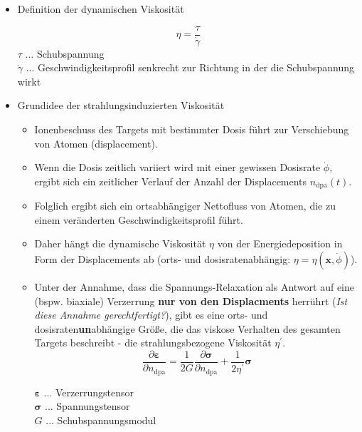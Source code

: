 \documentclass[a4paper, 10pt, 
               numbers=noenddot, toc=graduated,
               headsepline=true, footsepline=true,
               twoside=false, titlepage=true, 
               bibliography=totoc]{scrartcl}
\begin{document}
\begin{itemize}
	\item Definition der dynamischen Viskosität
	
	      \begin{equation}
		  \eta = \frac{\tau }{\dot{\gamma} }
	      \end{equation}
	      $\tau$ ... Schubspannung\\
	      $\dot{\gamma} $ ... Geschwindigkeitsprofil senkrecht zur Richtung in der die Schubspannung wirkt

	\item Grundidee der strahlungsinduzierten Viskosität \cite{hobler2017hpm}
	
		\begin{itemize}
			
			\item Ionenbeschuss des Targets mit bestimmter Dosis führt zur Verschiebung von Atomen (displacement).
			\item Wenn die Dosis zeitlich variiert wird mit einer gewissen Dosisrate $\dot \phi$, ergibt sich ein zeitlicher Verlauf der Anzahl der Displacements $n_\mathrm{dpa}(t)$.
			\item Folglich ergibt sich ein ortsabhängiger Nettofluss von Atomen, die zu einem veränderten Geschwindigkeitsprofil führt.
			
			\item Daher hängt die dynamische Viskosität $\eta$ von der Energiedeposition in Form der Displacements ab (orts- und dosisratenabhängig: $\eta = \eta(\bm{x}, \dot{\phi})$).
			
			\item Unter der Annahme, dass die Spannungs-Relaxation als Antwort auf eine (bspw. biaxiale) Verzerrung \textbf{nur von den Displacments} herrührt (\textit{Ist diese Annahme gerechtfertigt?}), gibt es eine orts- und dosisraten\textbf{un}abhängige Größe, die das viskose Verhalten des gesamten Targets beschreibt - die strahlungsbezogene Viskosität $\eta^{'}$.
			\begin{equation}
		  		\frac{\partial \bm{\varepsilon}}{\partial n_\mathrm{dpa} } = \frac{1}{2G} \frac{\partial \bm{\sigma}}{\partial n_\mathrm{dpa}} + \frac{1}{2 \eta^{'} }\bm \sigma
	      	\end{equation}
	      	
	      	$ \bm{\varepsilon}$ ... Verzerrungstensor\\
	      	$\bm\sigma$ ... Spannungstensor\\
	      	$G$ ... Schubspannungsmodul
			

\end{itemize}
\end{itemize}
\end{document}
